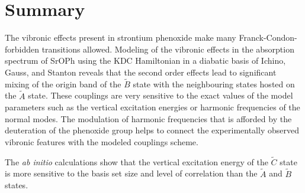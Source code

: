 \documentclass{article}
\begin{document}
\section{Summary}

The vibronic effects present in strontium phenoxide make many
Franck-Condon-forbidden transitions allowed. Modeling of the vibronic effects
in the absorption spectrum of SrOPh using the KDC Hamiltonian in a diabatic
basis of Ichino, Gauss, and Stanton reveals that the second order effects lead
to significant mixing of the origin band of the $\tilde{B}$ state with the
neighbouring states hosted on the $\tilde{A}$ state. These couplings are very
sensitive to the exact values of the model parameters such as the vertical
excitation energies or harmonic frequencies of the normal modes. The modulation
of harmonic frequencies that is afforded by the deuteration of the phenoxide
group helps to connect the experimentally observed vibronic features with the
modeled couplings scheme.

The \emph{ab initio} calculations show that the vertical excitation
energy of the $\tilde{C}$ state is more sensitive to the basis set size and
level of correlation than the $\tilde{A}$ and $\tilde{B}$ states.

\newpage
\printbibliography{}
\end{document}
